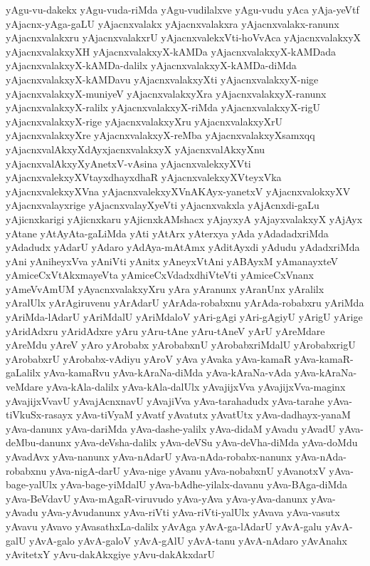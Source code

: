 {yAgu-vu-dakekx
yAgu-vuda-riMda
yAgu-vudilalxve
yAgu-vudu
yAca
yAja-yeVtf
yAjacnx-yAga-gaLU
yAjacnxvalakx
yAjacnxvalakxra
yAjacnxvalakx-ranunx
yAjacnxvalakxru
yAjacnxvalakxrU
yAjacnxvalekxVti-hoVvAca
yAjacnxvalakxyX
yAjacnxvalakxyXH
yAjacnxvalakxyX-kAMDa
yAjacnxvalakxyX-kAMDada
yAjacnxvalakxyX-kAMDa-dalilx
yAjacnxvalakxyX-kAMDa-diMda
yAjacnxvalakxyX-kAMDavu
yAjacnxvalakxyXti
yAjacnxvalakxyX-nige
yAjacnxvalakxyX-muniyeV
yAjacnxvalakxyXra
yAjacnxvalakxyX-ranunx
yAjacnxvalakxyX-ralilx
yAjacnxvalakxyX-riMda
yAjacnxvalakxyX-rigU
yAjacnxvalakxyX-rige
yAjacnxvalakxyXru
yAjacnxvalakxyXrU
yAjacnxvalakxyXre
yAjacnxvalakxyX-reMba
yAjacnxvalakxyXsamxqq
yAjacnxvalAkxyXdAyxjacnxvalakxyX
yAjacnxvalAkxyXnu
yAjacnxvalAkxyXyAnetxV-vAsina
yAjacnxvalekxyXVti
yAjacnxvalekxyXVtayxdhayxdhaR
yAjacnxvalekxyXVteyxVka
yAjacnxvalekxyXVna
yAjacnxvalekxyXVnAKAyx-yanetxV
yAjacnxvalokxyXV
yAjacnxvalayxrige
yAjacnxvalayXyeVti
yAjacnxvakxla
yAjAcnxdi-gaLu
yAjicnxkarigi
yAjicnxkaru
yAjicnxkAMshacx
yAjayxyA
yAjayxvalakxyX
yAjAyx
yAtane
yAtAyAta-gaLiMda
yAti
yAtArx
yAterxya
yAda
yAdadadxriMda
yAdadudx
yAdarU
yAdaro
yAdAya-mAtAmx
yAditAyxdi
yAdudu
yAdadxriMda
yAni
yAniheyxVva
yAniVti
yAnitx
yAneyxVtAni
yABAyxM
yAmanayxteV
yAmiceCxVtAkxmayeVta
yAmiceCxVdadxdhiVteVti
yAmiceCxVnanx
yAmeVvAmUM
yAyacnxvalakxyXru
yAra
yAranunx
yAranUnx
yAralilx
yAralUlx
yArAgiruvenu
yArAdarU
yArAda-robabxnu
yArAda-robabxru
yAriMda
yAriMda-lAdarU
yAriMdalU
yAriMdaloV
yAri-gAgi
yAri-gAgiyU
yArigU
yArige
yAridAdxru
yAridAdxre
yAru
yAru-tAne
yAru-tAneV
yArU
yAreMdare
yAreMdu
yAreV
yAro
yArobabx
yArobabxnU
yArobabxriMdalU
yArobabxrigU
yArobabxrU
yArobabx-vAdiyu
yAroV
yAva
yAvaka
yAva-kamaR
yAva-kamaR-gaLalilx
yAva-kamaRvu
yAva-kAraNa-diMda
yAva-kAraNa-vAda
yAva-kAraNa-veMdare
yAva-kAla-dalilx
yAva-kAla-dalUlx
yAvajijxVva
yAvajijxVva-maginx
yAvajijxVvavU
yAvajAcnxnavU
yAvajiVva
yAva-tarahadudx
yAva-tarahe
yAva-tiVkuSx-rasayx
yAva-tiVyaM
yAvatf
yAvatutx
yAvatUtx
yAva-dadhayx-yanaM
yAva-danunx
yAva-dariMda
yAva-dashe-yalilx
yAva-didaM
yAvadu
yAvadU
yAva-deMbu-danunx
yAva-deVsha-dalilx
yAva-deVSu
yAva-deVha-diMda
yAva-doMdu
yAvadAvx
yAva-nanunx
yAva-nAdarU
yAva-nAda-robabx-nanunx
yAva-nAda-robabxnu
yAva-nigA-darU
yAva-nige
yAvanu
yAva-nobabxnU
yAvanotxV
yAva-bage-yalUlx
yAva-bage-yiMdalU
yAva-bAdhe-yilalx-davanu
yAva-BAga-diMda
yAva-BeVdavU
yAva-mAgaR-viruvudo
yAva-yAva
yAva-yAva-danunx
yAva-yAvadu
yAva-yAvudanunx
yAva-riVti
yAva-riVti-yalUlx
yAvava
yAva-vasutx
yAvavu
yAvavo
yAvasathxLa-dalilx
yAvAga
yAvA-ga-lAdarU
yAvA-galu
yAvA-galU
yAvA-galo
yAvA-galoV
yAvA-gAlU
yAvA-tanu
yAvA-nAdaro
yAvAnahx
yAvitetxY
yAvu-dakAkxgiye
yAvu-dakAkxdarU
}
